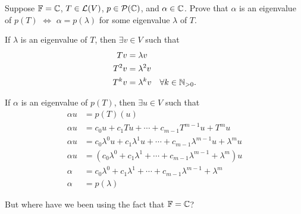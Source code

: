 \begin{xrcs}
  Suppose $\mathbb{F} = \mathbb{C}$, $T \in \mathcal{L}(V)$, $p \in \mathcal{P}(\mathbb{C})$, and $\alpha \in \mathbb{C}$. Prove that $\alpha$ is an eigenvalue of $p(T)$ $\iff$ $\alpha = p(\lambda)$ for some eigenvalue $\lambda$ of $T$.
  \begin{xprf}
    If $\lambda$ is an eigenvalue of $T$, then $\exists v \in V$ such that
    \begin{align}
      T v   &= \lambda   v \\
      T^2 v &= \lambda^2 v \\
      T^k v &= \lambda^k v \quad \forall k \in \mathbb{N}_{>0}.
    \end{align}

    \Rightarrowdirection If $\alpha$ is an eigenvalue of $p(T)$, then $\exists u \in V$ such that
    \begin{align}
      \alpha u &= p(T)(u)  \\
      \alpha u &= c_0 u + c_1 T u + \cdots + c_{m-1} T^{m-1} u + T^m u \\
      \alpha u &= c_0 \lambda^0 u + c_1 \lambda^1 u + \cdots + c_{m-1} \lambda^{m-1} u + \lambda ^m u \\
      \alpha u &= (c_0 \lambda^0 + c_1 \lambda^1 + \cdots + c_{m-1} \lambda^{m-1} + \lambda ^m ) u \\
      \alpha   &= c_0 \lambda^0 + c_1 \lambda^1 + \cdots + c_{m-1} \lambda^{m-1} + \lambda ^m \\
      \alpha   &= p(\lambda)
    \end{align}

    But where have we been using the fact that $\mathbb{F} = \mathbb{C}$?
  \end{xprf}
\end{xrcs}

